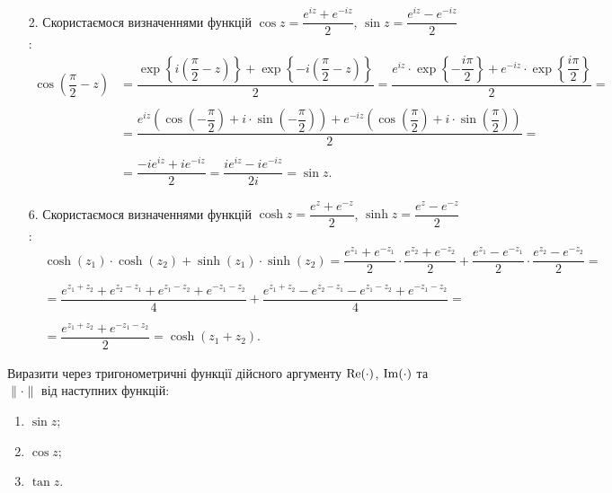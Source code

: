 \begin{solution}
    \begin{enumerate}
        \item[2.] 
        Скористаємося визначеннями функцій $\cos z = \dfrac{e^{iz} + e^{-iz}} 2$, $\sin z = \dfrac{e^{iz} - e^{-iz}}{2}$:
        \begin{align*}
            \cos \left( \dfrac \pi 2 - z \right) &= \dfrac{\exp\left\{i\left(\dfrac \pi 2 - z\right)\right\} + \exp\left\{-i\left(\dfrac \pi 2 - z\right)\right\}}{2} = \dfrac{e^{iz}\cdot\exp\left\{-\dfrac {i\pi} 2\right\} + e^{-iz}\cdot\exp\left\{\dfrac {i\pi} 2\right\}}{2} = \\
            \\
            &= \dfrac{e^{iz}\left(\cos\left(-\dfrac\pi2\right)+i\cdot\sin\left(-\dfrac\pi2\right)\right) + e^{-iz}\left(\cos\left(\dfrac\pi2\right)+i\cdot\sin\left(\dfrac\pi2\right)\right)}{2} = \\
            \\
            &= \dfrac{-ie^{iz}+ie^{-iz}}{2} = \dfrac{ie^{iz}-ie^{-iz}}{2i} = \sin z. 
        \end{align*}
        \item[6.] Скористаємося визначеннями функцій $\cosh z = \dfrac{e^{z} + e^{-z}} 2$, $\sinh z = \dfrac{e^{z} - e^{-z}}{2}$:
        \begin{align*}
            & \cosh (z_1) \cdot \cosh(z_2) + \sinh (z_1) \cdot \sinh (z_2) = \dfrac {e^{z_1} + e^{-z_1}} 2 \cdot \dfrac {e^{z_2} + e^{-z_2}} 2 + \dfrac {e^{z_1} - e^{-z_1}} 2 \cdot \dfrac {e^{z_2} - e^{-z_2}} 2 = \\
            \\
            &= \dfrac {e^{z_1 + z_2} + e^{z_2 - z_1} + e^{z_1 - z_2} + e^{-z_1 - z_2}} 4 + \dfrac {e^{z_1 + z_2} - e^{z_2 - z_1} - e^{z_1 - z_2} + e^{-z_1 - z_2}} 4 = \\
            \\
            &= \dfrac{e^{z_1 + z_2} + e^{- z_1 - z_2}}{2} = \cosh(z_1 + z_2).
        \end{align*}
    \end{enumerate}

\end{solution}

\begin{problem}[Волковиський, 67]
    Виразити через тригонометричні функції дійсного аргументу $\operatorname{Re}(\cdot)$, $\operatorname{Im}(\cdot)$ та $\|\cdot\|$ від наступних функцій: 
    \begin{enumerate}
        \item $\sin z$;
        \item $\cos z$;
        \item $\tan z$.
    \end{enumerate}

\end{problem}

